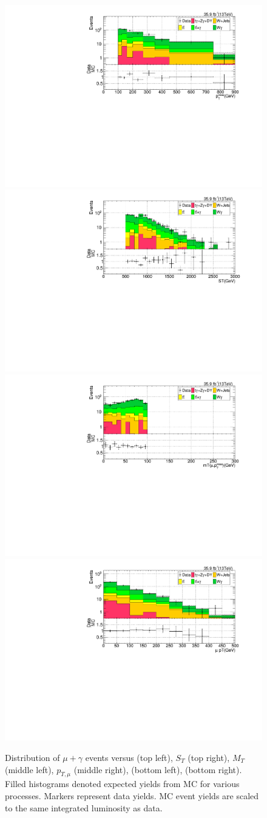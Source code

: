 \begin{figure}[h!]
\centering
\caption[Data vs MC for $\mu\gamma$ CR]{Distribution of $\mu+\gamma$ events versus \ptmiss (top left), $S_T$ (top right), 
$M_T$ (middle left), $p_{T,\mu}$ (middle right), \nj (bottom left), \nb (bottom right).  
Filled histograms denoted expected yields from MC for various processes.  Markers represent data yields.
MC event yields are scaled to the same integrated luminosity as data.}
\label{fig:lost_mu_CR_dist}
\includegraphics[width=0.48\linewidth]{../Figures/Chap3/lost_lepton/METvarBin_Mu1.pdf}
\includegraphics[width=0.48\linewidth]{../Figures/Chap3/lost_lepton/ST_Mu1.pdf}\\
\includegraphics[width=0.48\linewidth]{../Figures/Chap3/lost_lepton/MT_Mu.pdf}
\includegraphics[width=0.48\linewidth]{../Figures/Chap3/lost_lepton/MuPt.pdf}\\

\end{figure}
